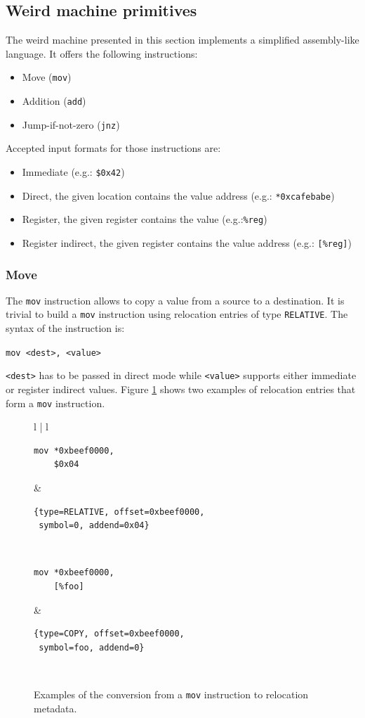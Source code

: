 \documentclass[11pt,twoside,a4paper]{article}
\begin{document}
\subsection{Weird machine primitives}

The weird machine presented in this section implements a simplified assembly-like language. It offers the following instructions:
\begin{itemize}
\item Move (\texttt{mov})
\item Addition (\texttt{add})
\item Jump-if-not-zero (\texttt{jnz})
\end{itemize}

Accepted input formats for those instructions are:
\begin{itemize}
\item Immediate (e.g.: \texttt{\$0x42})
\item Direct, the given location contains the value address (e.g.: \texttt{*0xcafebabe})
\item Register, the given register contains the value (e.g.:\texttt{\%reg})
\item Register indirect, the given register contains the value address (e.g.: \texttt{[\%reg]})
\end{itemize}


\subsubsection{Move}
The \texttt{mov} instruction allows to copy a value from a source to a destination. It is trivial to build a \texttt{mov} instruction using relocation entries of type \texttt{RELATIVE}. The syntax of the instruction is:

\texttt{mov <dest>, <value>}

\texttt{<dest>} has to be passed in direct mode while \texttt{<value>} supports either immediate or register indirect values. Figure \ref{mov_table} shows two examples of relocation entries that form a \texttt{mov} instruction.

\begin{figure}[ht]
\centering
\begin{tabular}{ l | l }
  \hline
\begin{lstlisting}
mov *0xbeef0000,
    $0x04
\end{lstlisting}
&
\begin{lstlisting}
{type=RELATIVE, offset=0xbeef0000,
 symbol=0, addend=0x04}
\end{lstlisting} \\
  \hline
\begin{lstlisting}
mov *0xbeef0000,
    [%foo]
\end{lstlisting}
&
\begin{lstlisting}
{type=COPY, offset=0xbeef0000,
 symbol=foo, addend=0}
\end{lstlisting} \\
  \hline
\end{tabular}
\caption{Examples of the conversion from a \texttt{mov} instruction to relocation metadata.}
\label{mov_table}
\end{figure}
\end{document}
